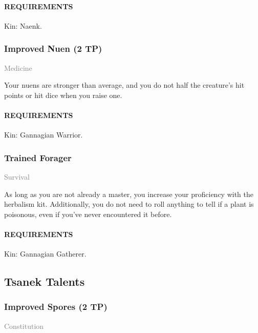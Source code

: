     \paragraph{REQUIREMENTS} Kin: Naenk.

    \subsubsection{Improved Nuen (2 TP)} \label{tal::improvednuen}
    \small{\textcolor{gray}{Medicine}}

    \normalsize
    Your nuens are stronger than average, and you do not half the creature's hit points or hit dice when you raise one.

    \paragraph{REQUIREMENTS} Kin: Gannagian Warrior.

    \subsubsection{Trained Forager} \label{tal::trainedforager}
    \small{\textcolor{gray}{Survival}}

    \normalsize
    As long as you are not already a master, you increase your proficiency with the herbalism kit.
    Additionally, you do not need to roll anything to tell if a plant is poisonous, even if you've never encountered it before.
    \paragraph{REQUIREMENTS} Kin: Gannagian Gatherer.

\subsection*{Tsanek Talents}
    \subsubsection{Improved Spores (2 TP)} \label{tal::improvedspores}
    \small{\textcolor{gray}{Constitution}}


